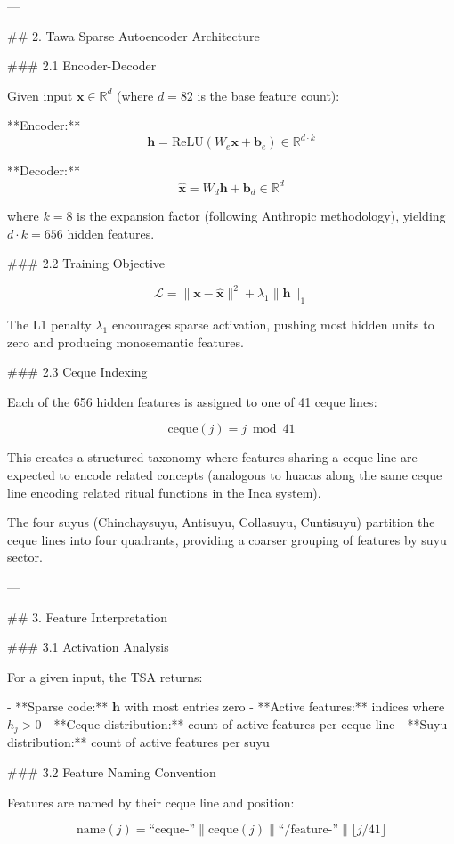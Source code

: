 ---

## 2. Tawa Sparse Autoencoder Architecture

### 2.1 Encoder-Decoder

Given input \( \mathbf{x} \in \mathbb{R}^d \) (where \( d = 82 \) is the base feature count):

**Encoder:**
\[
\mathbf{h} = \text{ReLU}(W_e \mathbf{x} + \mathbf{b}_e) \in \mathbb{R}^{d \cdot k}
\]

**Decoder:**
\[
\hat{\mathbf{x}} = W_d \mathbf{h} + \mathbf{b}_d \in \mathbb{R}^d
\]

where \( k = 8 \) is the expansion factor (following Anthropic methodology), yielding \( d \cdot k = 656 \) hidden features.

### 2.2 Training Objective

\[
\mathcal{L} = \|\mathbf{x} - \hat{\mathbf{x}}\|^2 + \lambda_1 \|\mathbf{h}\|_1
\]

The L1 penalty \( \lambda_1 \) encourages sparse activation, pushing most hidden units to zero and producing monosemantic features.

### 2.3 Ceque Indexing

Each of the 656 hidden features is assigned to one of 41 ceque lines:

\[
\text{ceque}(j) = j \bmod 41
\]

This creates a structured taxonomy where features sharing a ceque line are expected to encode related concepts (analogous to huacas along the same ceque line encoding related ritual functions in the Inca system).

The four suyus (Chinchaysuyu, Antisuyu, Collasuyu, Cuntisuyu) partition the ceque lines into four quadrants, providing a coarser grouping of features by suyu sector.

---

## 3. Feature Interpretation

### 3.1 Activation Analysis

For a given input, the TSA returns:

- **Sparse code:** \( \mathbf{h} \) with most entries zero
- **Active features:** indices where \( h_j > 0 \)
- **Ceque distribution:** count of active features per ceque line
- **Suyu distribution:** count of active features per suyu

### 3.2 Feature Naming Convention

Features are named by their ceque line and position:

\[
\text{name}(j) = \text{``ceque-''} \| \text{ceque}(j) \| \text{``/feature-''} \| \lfloor j / 41 \rfloor
\]

